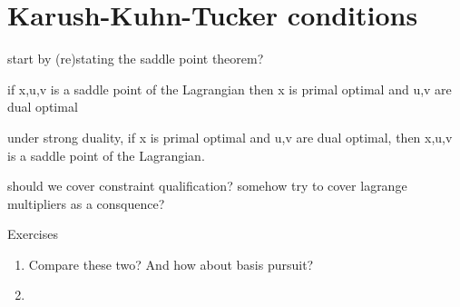 \chapter{Karush-Kuhn-Tucker conditions}
\label{chap:kkt}

start by (re)stating the saddle point theorem?

if x,u,v is a saddle point of the Lagrangian then x is primal optimal and u,v
are dual optimal

under strong duality, if x is primal optimal and u,v are dual optimal, then
x,u,v is a saddle point of the Lagrangian.

should we cover constraint qualification? 
somehow try to cover lagrange multipliers as a consquence?

\begin{xcb}{Exercises}
\begin{enumerate}[label=\thechapter.\arabic*]
\settowidth{\leftmargini}{00.00.\hskip\labelsep}
\item \label{ex:lasso_dantzig}
Compare these two? And how about basis pursuit?

\item \label{ex:simplex_projection}

\end{enumerate}
\end{xcb}